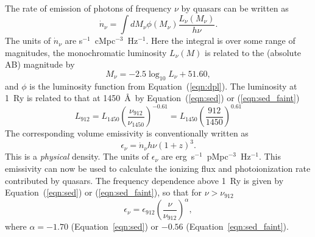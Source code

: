 \documentclass[a4paper,fleqn,usenatbib]{mnras}
\begin{document}
The rate of emission of photons of frequency $\nu$ by quasars can be
written as
\begin{equation}
\dot n_\nu = \int dM_\nu \phi(M_\nu) \frac{L_\nu(M_\nu)}{h\nu}.
\end{equation}
The units of $\dot n_\nu$ are s$^{-1}$~cMpc$^{-3}$~Hz$^{-1}$.  Here
the integral is over some range of magnitudes, the monochromatic
luminosity $L_\nu(M)$ is related to the (absolute AB) magnitude
by \citep{1983ApJ...266..713O}
\begin{equation}
M_\nu = -2.5\log_{10}L_\nu+51.60,
\end{equation}
and $\phi$ is the luminosity function from Equation~(\ref{eqn:dpl}).
The luminosity at 1~Ry is related to that at 1450~\AA\ by
Equation~(\ref{eqn:sed}) or (\ref{eqn:sed_faint})
\begin{equation}
  L_{912}=L_{1450}\left(\frac{\nu_{912}}{\nu_{1450}}\right)^{-0.61}=L_{1450}\left(\frac{912}{1450}\right)^{0.61}
\end{equation}
The corresponding volume emissivity is conventionally written
as 
\begin{equation}
\epsilon_\nu = \dot n_\nu h\nu (1+z)^3.
\label{eqn:epsilon}
\end{equation}
This is a \emph{physical} density.  The units of $\epsilon_\nu$ are
erg~s$^{-1}$~pMpc$^{-3}$~Hz$^{-1}$.  This emissivity can now be used
to calculate the ionizing flux and photoionization rate contributed by
quasars.  The frequency dependence above 1~Ry is given by
Equation~(\ref{eqn:sed}) or (\ref{eqn:sed_faint}), so that for $\nu >
\nu_{912}$
\begin{equation}
  \epsilon_\nu = \epsilon_{912}\left(\frac{\nu}{\nu_{912}}\right)^\alpha,
  \label{eqn:epsilon_freq}
\end{equation}
where $\alpha=-1.70$ (Equation~\ref{eqn:sed}) or $-0.56$ (Equation~\ref{eqn:sed_faint}). 
\end{document}
